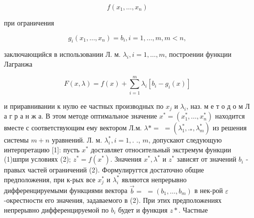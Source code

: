 \documentclass[10pt]{article}
\begin{document}
\[

f\left(x_{1}, \ldots, x_{n}\right)

\]



при ограничения



\[

g_{i}\left(x_{1}, \ldots, x_{n}\right)=b_{i}, i=1, \ldots, m, m<n,

\]



заключающийся в использовании Л. м. $\lambda_{i}, i=1, \ldots, m$, построении функции Лагранжа



\[

F(x, \lambda)=f(x)+\sum_{i=1}^{m} \lambda_{i}\left[b_{i}-g_{i}(x)\right]

\]



и приравнивании к нулю ее частных производных по $x_{j}$ и $\lambda_{i}$, наз. м е т о д о м Л а г р а н ж а. В этом методе оптимальное значение $x^{*}=\left(x_{1}^{*}, \ldots, x_{n}^{*}\right)$ находится вместе с соответствующим ему вектором Л.м. $\lambda *=$ $=\left(\lambda_{1}^{*}, ._{*}, \lambda_{m}^{*}\right)$ из решения системы $m+n$ уравнений. Л. м. $\lambda_{i}^{*}, i=1,$. ., $m$, допускают следующую интерпретацию [1]: пусть $x^{*}$ доставляет относительный экстремум функции (1)шпри условиях (2); $z^{*}=f\left(x^{*}\right)$. Значения $x^{*}, \lambda^{*}$ и $z^{*}$ зависят от значений $b_{i}$ - правых частей ограничений (2). Формулиругтся достаточно общие предположения, при к-рых все $x_{j}^{*}$ и $\lambda_{i}^{*}$ являются непрерывно дифференцируемыми функциями вектора $\vec{b}=$ $=\left(b_{1}, \ldots, b_{m}\right)$ в нек-рой $\varepsilon$-окрестности его значения, задаваемого в (2). При этих предположениях непрерывно дифференцируемой по $b_{i}$ будет и функция $z *$. Частные
\end{document}
